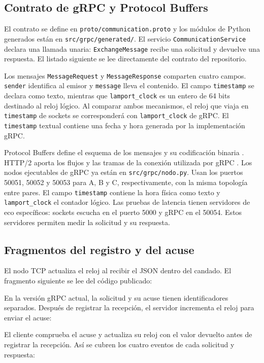 \subsection{Contrato de gRPC y Protocol Buffers}
El contrato se define en \texttt{proto/communication.proto} y los
módulos de Python generados están en \texttt{src/grpc/generated/}.
El servicio \texttt{CommunicationService} declara una llamada unaria:
\texttt{ExchangeMessage} recibe una solicitud y devuelve una respuesta.
El listado siguiente se lee directamente del contrato del repositorio.



Los mensajes \texttt{MessageRequest} y \texttt{MessageResponse}
comparten cuatro campos. \texttt{sender} identifica al emisor y
\texttt{message} lleva el contenido. El campo \texttt{timestamp} se
declara como texto, mientras que \texttt{lamport\_clock} es un entero
de 64 bits destinado al reloj lógico. Al comparar ambos mecanismos,
el reloj que viaja en \texttt{timestamp} de sockets se corresponderá
con \texttt{lamport\_clock} de gRPC. El \texttt{timestamp} textual
contiene una fecha y hora generada por la implementación gRPC.

Protocol Buffers define el esquema de los mensajes y su codificación
binaria \cite{jackson2024streaming}. HTTP/2 aporta los flujos y las
tramas de la conexión utilizada por gRPC \cite{thomson2022http2}.
Los nodos ejecutables de gRPC ya están en \texttt{src/grpc/nodo.py}.
Usan los puertos 50051, 50052 y 50053 para A, B y C, respectivamente,
con la misma topología entre pares. El campo \texttt{timestamp}
contiene la hora física como texto y \texttt{lamport\_clock} el
contador lógico. Las pruebas de latencia tienen servidores de eco
específicos: sockets escucha en el puerto 5000 y gRPC en el 50054.
Estos servidores permiten medir la solicitud y su respuesta.
\endgroup

\subsection{Fragmentos del registro y del acuse}
El nodo TCP actualiza el reloj al recibir el JSON dentro del candado.
El fragmento siguiente se lee del código publicado:


En la versión gRPC actual, la solicitud y su acuse tienen
identificadores separados. Después de registrar la recepción,
el servidor incrementa el reloj para enviar el acuse:


El cliente comprueba el acuse y actualiza su reloj con el valor
devuelto antes de registrar la recepción. Así se cubren los cuatro
eventos de cada solicitud y respuesta:

